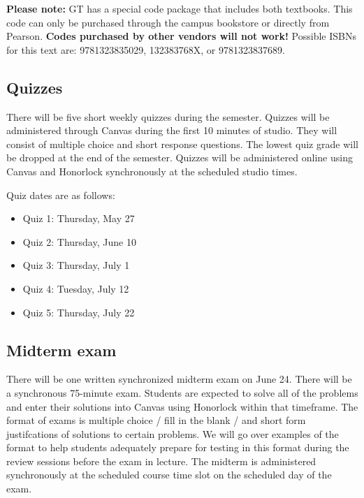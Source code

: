 \documentclass[11pt]{article}
\begin{document}
\vspace{0.5 em}

{{\bf Please note:}} GT has a special code package that includes both textbooks. This code can only be purchased through the campus bookstore or directly from Pearson. {\bf Codes purchased by other vendors will not work!} 
Possible ISBNs for this text are: 9781323835029, 132383768X, or 9781323837689. 

    \subsection{Quizzes}
    
    There will be five short weekly quizzes during the semester. Quizzes will be administered through Canvas during the first 10 minutes of studio. They will consist of multiple choice and short response questions. The lowest quiz grade will be dropped at the end of the semester. Quizzes will be administered online using Canvas and Honorlock synchronously at the 
    scheduled studio times. 
    
        Quiz dates are as follows:
        \begin{itemize}
            \item Quiz 1: Thursday, May 27
            \item Quiz 2: Thursday, June 10
            \item Quiz 3: Thursday, July 1
            \item Quiz 4: Tuesday, July 12
            \item Quiz 5: Thursday, July 22
        \end{itemize}

   \subsection{Midterm  exam}
    
    There will be one written synchronized midterm exam on June 24. There will be a synchronous 75-minute exam. 
    Students are expected to solve all of the problems and enter their solutions into Canvas using Honorlock within 
    that timeframe. The format of exams is multiple choice / fill in the blank / and short form justifcations of 
    solutions to certain problems. We will go over examples of the format to help students 
    adequately prepare for testing in this format during the review sessions before the exam in lecture. 
    The midterm is administered synchronously at the scheduled course time slot on the scheduled day of the exam. 
\end{document}
